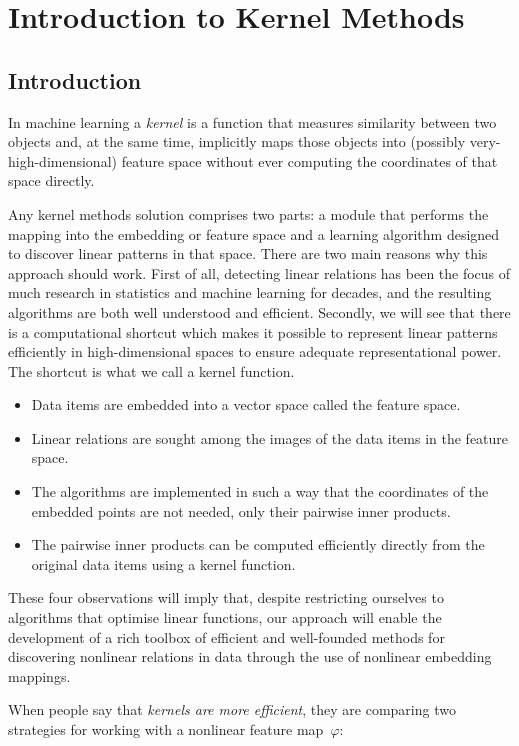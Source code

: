 \chapter{Introduction to Kernel Methods}

\section{Introduction}

In machine learning a \textit{kernel} is a function that measures similarity between two objects and, at the same time, implicitly maps those objects into (possibly very-high-dimensional) feature space without ever computing the coordinates of that space directly.

Any kernel methods solution comprises two parts: a module that performs the mapping into the embedding or feature space and a learning algorithm designed to discover linear patterns in that space. There are two main reasons why this approach should work. First of all, detecting linear relations has been the focus of much research in statistics and machine learning for decades, and the resulting algorithms are both well understood and efficient. Secondly, we will see that there is a computational shortcut which makes it possible to represent linear patterns efficiently in high-dimensional spaces to ensure adequate representational power. The shortcut is what we call a kernel function.

\begin{itemize}
	\item Data items are embedded into a vector space called the feature space. 
	\item Linear relations are sought among the images of the data items in the feature space.
	\item The algorithms are implemented in such a way that the coordinates of the embedded points are not needed, only their pairwise inner products. 
	\item The pairwise inner products can be computed efficiently directly from the original data items using a kernel function.
\end{itemize}
These four observations will imply that, despite restricting ourselves to algorithms that optimise linear functions, our approach will enable the development of a rich toolbox of efficient and well-founded methods for discovering nonlinear relations in data through the use of nonlinear embedding mappings.

When people say that \emph{kernels are more efficient}, they are comparing two strategies for working with a nonlinear feature map~$\varphi$:

